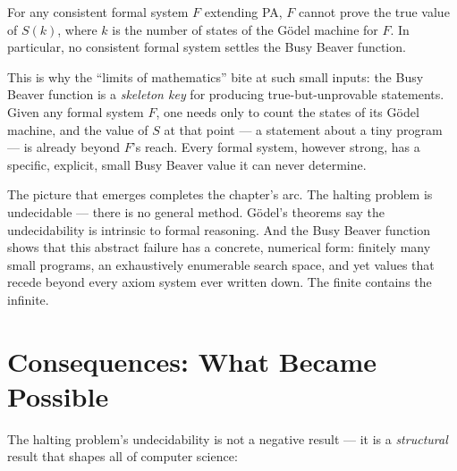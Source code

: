 \begin{corollary}
For any consistent formal system $F$ extending PA, $F$ cannot prove the true value of $S(k)$, where $k$ is the number of states of the G\"odel machine for $F$. In particular, no consistent formal system settles the Busy Beaver function.
\end{corollary}

This is why the ``limits of mathematics'' bite at such small inputs: the Busy Beaver function is a \emph{skeleton key} for producing true-but-unprovable statements. Given any formal system $F$, one needs only to count the states of its G\"odel machine, and the value of $S$ at that point --- a statement about a tiny program --- is already beyond $F$'s reach. Every formal system, however strong, has a specific, explicit, small Busy Beaver value it can never determine.

The picture that emerges completes the chapter's arc. The halting problem is undecidable --- there is no general method. G\"odel's theorems say the undecidability is intrinsic to formal reasoning. And the Busy Beaver function shows that this abstract failure has a concrete, numerical form: finitely many small programs, an exhaustively enumerable search space, and yet values that recede beyond every axiom system ever written down. The finite contains the infinite.

\section{Consequences: What Became Possible}
\label{sec:halting:consequences}

The halting problem's undecidability is not a negative result — it is a \emph{structural} result that shapes all of computer science:

